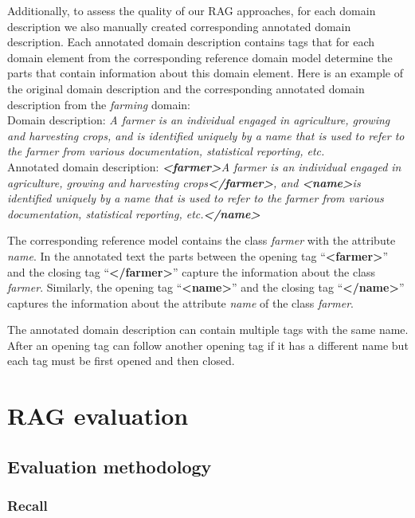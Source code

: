 Additionally, to assess the quality of our RAG approaches, for each domain description we also manually created corresponding annotated domain description. Each annotated domain description contains tags that for each domain element from the corresponding reference domain model determine the parts that contain information about this domain element. Here is an example of the original domain description and the corresponding annotated domain description from the \emph{farming} domain: \\

\noindent{}Domain description: \textit{A farmer is an individual engaged in agriculture, growing and harvesting crops, and is identified uniquely by a name that is used to refer to the farmer from various documentation, statistical reporting, etc.} \\

\noindent{}Annotated domain description: \textit{\textbf{<farmer>}A farmer is an individual engaged in agriculture, growing and harvesting crops\textbf{</farmer>}, and \textbf{<name>}is identified uniquely by a name that is used to refer to the farmer from various documentation, statistical reporting, etc.\textbf{</name>}}

The corresponding reference model contains the class \textit{farmer} with the attribute \textit{name}. In the annotated text the parts between the opening tag ``\textbf{<farmer>}'' and the closing tag ``\textbf{</farmer>}'' capture the information about the class \textit{farmer}. Similarly, the opening tag ``\textbf{<name>}'' and the closing tag ``\textbf{</name>}'' captures the information about the attribute \textit{name} of the class \textit{farmer}.

The annotated domain description can contain multiple tags with the same name. After an opening tag can follow another opening tag if it has a different name but each tag must be first opened and then closed.


\section{RAG evaluation}
\label{sec:filtering_evaluation}


\subsection{Evaluation methodology}

\subsubsection{Recall}

